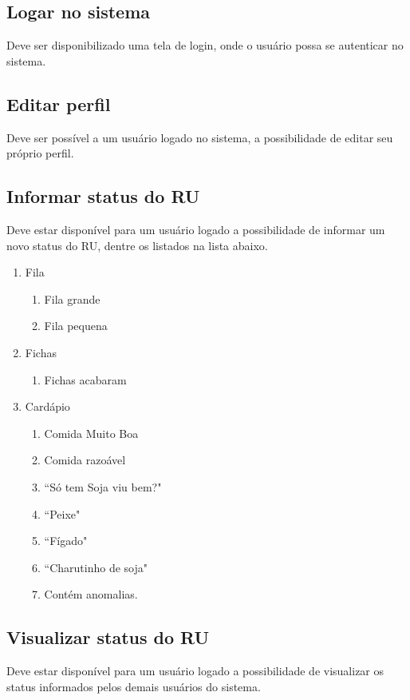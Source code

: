 \documentclass[12pt]{article}
\begin{document}
\subsection{Logar no sistema}
Deve ser disponibilizado uma tela de login, onde o usuário possa se autenticar no sistema.

\subsection{Editar perfil}
Deve ser possível a um usuário logado no sistema, a possibilidade de editar seu próprio perfil.

\subsection{Informar status do RU}
Deve estar disponível para um usuário logado a possibilidade de informar um novo status do RU, dentre os listados na lista abaixo.

\begin{enumerate}

  \item Fila
  \begin{enumerate}
    \item Fila grande
    \item Fila pequena
  \end{enumerate}
  \item Fichas
  \begin{enumerate}
    \item Fichas acabaram
  \end{enumerate}
  \item Cardápio
  \begin{enumerate}
    \item Comida Muito Boa
    \item Comida razoável
    \item ``Só tem Soja viu bem?"
    \item ``Peixe"
    \item ``Fígado"
    \item ``Charutinho de soja"
    \item Contém anomalias.
  \end{enumerate}

\end{enumerate}

\subsection{Visualizar status do RU}
Deve estar disponível para um usuário logado a possibilidade de visualizar os status informados pelos demais usuários do sistema.
\end{document}
